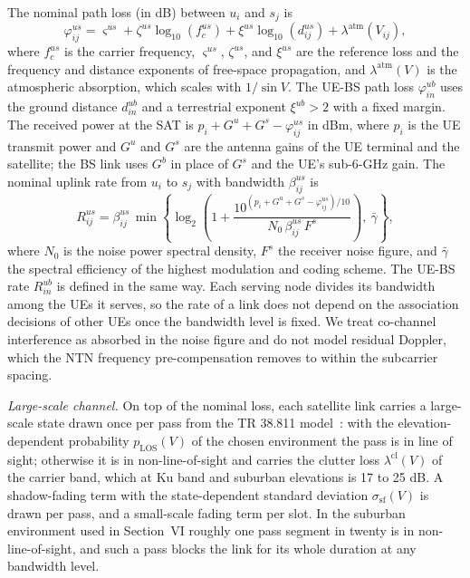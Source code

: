 The nominal path loss (in dB) between $u_i$ and $s_j$ is
\begin{equation}
    \varphi^{us}_{ij}=\varsigma^{us}+\zeta^{us}\log_{10}\!\left(f_{c}^{us}\right)
    +\xi^{us}\log_{10}\!\left(d^{us}_{ij}\right)+\lambda^{\mathrm{atm}}(V_{ij}),
\end{equation}
where $f_c^{us}$ is the carrier frequency, $\varsigma^{us}$, $\zeta^{us}$, and $\xi^{us}$ are the reference loss and
the frequency and distance exponents of free-space propagation, and $\lambda^{\mathrm{atm}}(V)$ is the atmospheric
absorption, which scales with $1/\sin V$. The UE-BS path loss $\varphi^{ub}_{in}$ uses the ground distance $d^{ub}_{in}$
and a terrestrial exponent $\xi^{ub}>2$ with a fixed margin. The received power at the SAT is
$p_i+G^{u}+G^{s}-\varphi^{us}_{ij}$ in dBm, where $p_i$ is the UE transmit power and $G^{u}$ and $G^{s}$ are the
antenna gains of the UE terminal and the satellite; the BS link uses $G^{b}$ in place of $G^{s}$ and the UE's sub-6-GHz
gain. The nominal uplink rate from $u_i$ to $s_j$ with bandwidth $\beta^{us}_{ij}$ is
\begin{equation}
    R^{us}_{ij}=\beta_{ij}^{us}\,\min\!\left\{\log_{2}\!\left(1+
    \frac{10^{(p_{i}+G^{u}+G^{s}-\varphi^{us}_{ij})/10}}{N_0\,\beta^{us}_{ij}\,F^{s}}\right),\ \bar{\gamma}\right\},
    \label{eq:rate_us}
\end{equation}
where $N_0$ is the noise power spectral density, $F^{s}$ the receiver noise figure, and $\bar\gamma$ the spectral
efficiency of the highest modulation and coding scheme. The UE-BS rate $R^{ub}_{in}$ is defined in the same way. Each
serving node divides its bandwidth among the UEs it serves, so the rate of a link does not depend on the association
decisions of other UEs once the bandwidth level is fixed. We treat co-channel interference as absorbed in the noise
figure and do not model residual Doppler, which the NTN frequency pre-compensation removes to within the subcarrier
spacing.

\emph{Large-scale channel.} On top of the nominal loss, each satellite link carries a large-scale state drawn once per
pass from the TR 38.811 model~\cite{TR38811}: with the elevation-dependent probability $p_{\mathrm{LOS}}(V)$ of the
chosen environment the pass is in line of sight; otherwise it is in non-line-of-sight and carries the clutter loss
$\lambda^{\mathrm{cl}}(V)$ of the carrier band, which at Ku band and suburban elevations is 17 to 25 dB. A shadow-fading
term with the state-dependent standard deviation $\sigma_{\mathrm{sf}}(V)$ is drawn per pass, and a small-scale fading
term per slot. In the suburban environment used in Section~VI roughly one pass segment in twenty is in
non-line-of-sight, and such a pass blocks the link for its whole duration at any bandwidth level.

